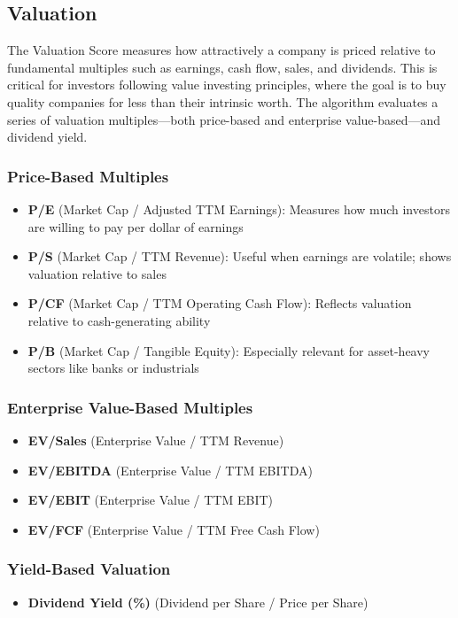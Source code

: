 \documentclass[11pt,english,a4paper,hidelinks]{book}
\begin{document}
\subsection{Valuation}
\noindent The Valuation Score measures how attractively a company is priced relative to fundamental multiples such as earnings, cash flow, sales, and dividends. This is critical for investors following value investing principles, where the goal is to buy quality companies for less than their intrinsic worth. The algorithm evaluates a series of valuation multiples—both price-based and enterprise value-based—and dividend yield.


\subsubsection{Price-Based Multiples}
\begin{itemize}
    \item \textbf{P/E} (Market Cap / Adjusted TTM Earnings): Measures how much investors are willing to pay per dollar of earnings
    \item \textbf{P/S} (Market Cap / TTM Revenue): Useful when earnings are volatile; shows valuation relative to sales
    \item \textbf{P/CF} (Market Cap / TTM Operating Cash Flow): Reflects valuation relative to cash-generating ability
    \item \textbf{P/B} (Market Cap / Tangible Equity): Especially relevant for asset-heavy sectors like banks or industrials
\end{itemize}

\subsubsection{Enterprise Value-Based Multiples}
\begin{itemize}
    \item \textbf{EV/Sales} (Enterprise Value / TTM Revenue)
    \item \textbf{EV/EBITDA} (Enterprise Value / TTM EBITDA)
    \item \textbf{EV/EBIT} (Enterprise Value / TTM EBIT)
    \item \textbf{EV/FCF} (Enterprise Value / TTM Free Cash Flow)
\end{itemize}

\subsubsection{Yield-Based Valuation}
\begin{itemize}
    \item \textbf{Dividend Yield (\%)} (Dividend per Share / Price per Share)
\end{itemize}
\end{document}
